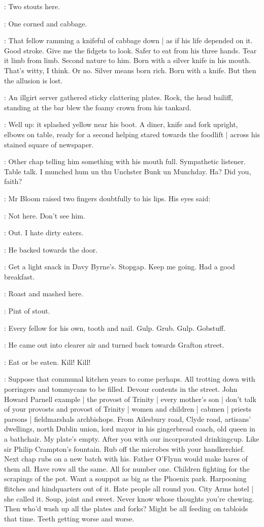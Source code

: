 :
Two stouts here.

:
One corned and cabbage.

\BloomInt:
That fellow ramming a knifeful of cabbage down |
as if his life depended on it.
Good stroke.
Give me the fidgets to look.
Safer to eat from his three hands.
Tear it limb from limb.
Second nature to him.
Born with a silver knife in his mouth.
That's witty, I think.
Or no.
Silver means born rich.
Born with a knife.
But then the allusion is lost.

:
An illgirt server gathered sticky clattering plates.
Rock, the head bailiff,
standing at the bar blew the foamy crown from his tankard.

:
Well up:
it splashed yellow near his boot.
A diner, knife and fork upright,
elbows on table,
ready for a second helping stared towards the foodlift |
across his stained square of newspaper.

\BloomInt:
Other chap telling him something with his mouth full.
Sympathetic listener.
Table talk.
I munched hum un thu Unchster Bunk un Munchday.
Ha?
Did you, faith?

:
Mr Bloom raised two fingers doubtfully to his lips.
His eyes said:

\Bloom:
Not here.
Don't see him.

\BloomInt:
Out.
I hate dirty eaters.

:
He backed towards the door.

\BloomInt:
Get a light snack in Davy Byrne's.
Stopgap.
Keep me going.
Had a good breakfast.

:
Roast and mashed here.

:
Pint of stout.

\BloomInt:
Every fellow for his own, tooth and nail.
Gulp.
Grub.
Gulp.
Gobstuff.

:
He came out into clearer air and turned back towards Grafton street.

\BloomInt:
Eat or be eaten.
Kill!
Kill!

\BloomInt:
Suppose that communal kitchen years to come perhaps.
All trotting down with porringers and tommycans to be filled.
Devour contents in the street.
John Howard Parnell example |
the provost of Trinity |
every mother's son |
don't talk of your provosts and provost of Trinity |
women and children |
cabmen |
priests parsons |
fieldmarshals archbishops.
From Ailesbury road,
Clyde road,
artisans' dwellings,
north Dublin union,
lord mayor in his gingerbread coach,
old queen in a bathchair.
My plate's empty.
After you with our incorporated drinkingcup.
Like sir Philip Crampton's fountain.
Rub off the microbes with your handkerchief.
Next chap rubs on a new batch with his.
Father O'Flynn would make hares of them all.
Have rows all the same.
All for number one.
Children fighting for the scrapings of the pot.
Want a souppot as big as the Phoenix park.
Harpooning flitches and hindquarters out of it.
Hate people all round you.
City Arms hotel |
she called it.
Soup, joint and sweet.
Never know whose thoughts you're chewing.
Then who'd wash up all the plates and forks?
Might be all feeding on tabloids that time.
Teeth getting worse and worse.

